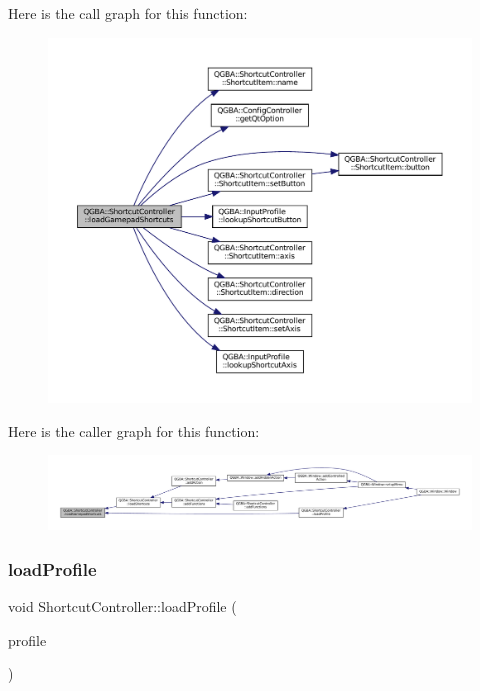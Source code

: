 Here is the call graph for this function\+:
\nopagebreak
\begin{figure}[H]
\begin{center}
\leavevmode
\includegraphics[width=350pt]{class_q_g_b_a_1_1_shortcut_controller_af130660b45ff1e2f2e676098201f3fa1_cgraph}
\end{center}
\end{figure}
Here is the caller graph for this function\+:
\nopagebreak
\begin{figure}[H]
\begin{center}
\leavevmode
\includegraphics[width=350pt]{class_q_g_b_a_1_1_shortcut_controller_af130660b45ff1e2f2e676098201f3fa1_icgraph}
\end{center}
\end{figure}
\mbox{\label{class_q_g_b_a_1_1_shortcut_controller_a9cef8d1b6210a7648f716467f80abd63}} 
\subsubsection{\texorpdfstring{load\+Profile}{loadProfile}}
{\footnotesize\ttfamily void Shortcut\+Controller\+::load\+Profile (\begin{DoxyParamCaption}\item[{const Q\+String \&}]{profile }\end{DoxyParamCaption})\hspace{0.3cm}{\ttfamily [slot]}}

